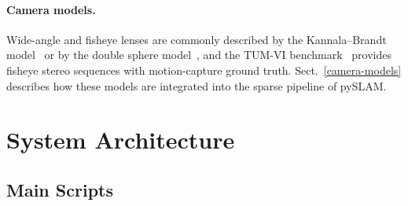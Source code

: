\documentclass{article}
\let\oldparagraph\paragraph
\renewcommand{\paragraph}[1]{\oldparagraph{#1}\mbox{}}
\begin{document}
\paragraph{Camera models.}
Wide-angle and fisheye lenses are commonly described by the Kannala--Brandt model~\cite{kannala2006generic} or by the double sphere model~\cite{usenko2018double}, and the TUM-VI benchmark~\cite{schubert2018tumvi} provides fisheye stereo sequences with motion-capture ground truth. Sect.~\ref{camera-models} describes how these models are integrated into the sparse pipeline of pySLAM.

\hypertarget{system_overview}{%
\section{System Architecture}\label{sec:architecture}}

\subsection{Main Scripts}
\end{document}
